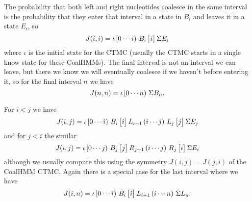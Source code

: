 The probability that both left and right nucleotides coalesce in the same interval is the probability that they enter that interval in a state in $B_i$ and leaves it in a state $E_i$, so
\[
    J(i,i) = \iota\,\mathbf{[}0\cdots i\mathbf{)}\,\,{B_i}\,\mathbf{\big[}i\mathbf{\big]}\,{\Sigma E_i}
\]
where $\iota$ is the initial state for the CTMC (usually the CTMC starts in a single know state for these CoalHMMs). The final interval is not an interval we can leave, but there we know we will eventually coalesce if we haven't before entering it, so for the final interval $n$ we have
\[
    J(n,n) = \iota\,\mathbf{[}0\cdots n\mathbf{)}\,\,{\Sigma B_n}
    .
\]

For $i<j$ we have
\[
    J(i,j) = \iota\,\mathbf{[}0\cdots i\mathbf{)}\,\,{B_i}\,\mathbf{\big[}i\mathbf{\big]}\,{L_{i+1}}\,\mathbf{(}i\cdots j\mathbf{)}\,\,{L_j}\,\mathbf{\big[}j\mathbf{\big]}\,{\Sigma E_j}
\]
and for $j<i$ the similar
\[
    J(i,j) = \iota\,\mathbf{[}0\cdots j\mathbf{)}\,\,{B_j}\,\mathbf{\big[}j\mathbf{\big]}\,{R_{j+1}}\,\mathbf{(}i\cdots j\mathbf{)}\,\,{R_j}\,\mathbf{\big[}i\mathbf{\big]}\,{\Sigma E_i}
\]
although we usually compute this using the symmetry $J(i,j)=J(j,i)$ of the CoalHMM CTMC. Again there is a special case for the last interval where we have
\[
    J(i,n) = \iota\,\mathbf{[}0\cdots i\mathbf{)}\,\,{B_i}\,\mathbf{\big[}i\mathbf{\big]}\,{L_{i+1}}\,\mathbf{(}i\cdots n\mathbf{)}\,\,{\Sigma L_n}    .
\]
